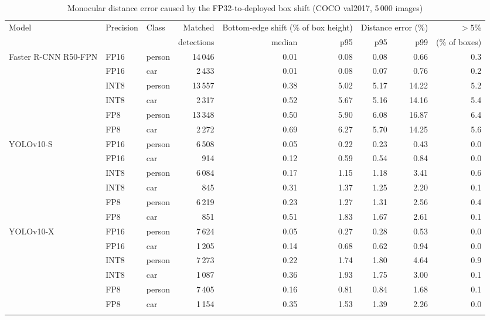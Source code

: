 \begin{table}
\footnotesize\setlength{\tabcolsep}{4pt}
\caption{Monocular distance error caused by the FP32-to-deployed box shift (COCO val2017, 5\,000 images)}\label{tab:localization}
\begin{tabular}{@{}lllrrrrrr@{}}
\toprule
Model & Precision & Class & Matched & \multicolumn{2}{c}{Bottom-edge shift (\% of box height)} & \multicolumn{2}{c}{Distance error (\%)} & $>5$\% \\
\cmidrule{5-6}\cmidrule{7-8}
 & & & detections & median & p95 & p95 & p99 & (\% of boxes) \\
\midrule
Faster R-CNN R50-FPN & FP16 & person & 14\,046 & 0.01 & 0.08 & 0.08 & 0.66 & 0.3 \\
 & FP16 & car & 2\,433 & 0.01 & 0.08 & 0.07 & 0.76 & 0.2 \\
 & INT8 & person & 13\,557 & 0.38 & 5.02 & 5.17 & 14.22 & 5.2 \\
 & INT8 & car & 2\,317 & 0.52 & 5.67 & 5.16 & 14.16 & 5.4 \\
 & FP8 & person & 13\,348 & 0.50 & 5.90 & 6.08 & 16.87 & 6.4 \\
 & FP8 & car & 2\,272 & 0.69 & 6.27 & 5.70 & 14.25 & 5.6 \\
\midrule
YOLOv10-S & FP16 & person & 6\,508 & 0.05 & 0.22 & 0.23 & 0.43 & 0.0 \\
 & FP16 & car & 914 & 0.12 & 0.59 & 0.54 & 0.84 & 0.0 \\
 & INT8 & person & 6\,084 & 0.17 & 1.15 & 1.18 & 3.41 & 0.6 \\
 & INT8 & car & 845 & 0.31 & 1.37 & 1.25 & 2.20 & 0.1 \\
 & FP8 & person & 6\,219 & 0.23 & 1.27 & 1.31 & 2.56 & 0.4 \\
 & FP8 & car & 851 & 0.51 & 1.83 & 1.67 & 2.61 & 0.1 \\
\midrule
YOLOv10-X & FP16 & person & 7\,624 & 0.05 & 0.27 & 0.28 & 0.53 & 0.0 \\
 & FP16 & car & 1\,205 & 0.14 & 0.68 & 0.62 & 0.94 & 0.0 \\
 & INT8 & person & 7\,273 & 0.22 & 1.74 & 1.80 & 4.64 & 0.9 \\
 & INT8 & car & 1\,087 & 0.36 & 1.93 & 1.75 & 3.00 & 0.1 \\
 & FP8 & person & 7\,405 & 0.16 & 0.81 & 0.84 & 1.68 & 0.1 \\
 & FP8 & car & 1\,154 & 0.35 & 1.53 & 1.39 & 2.26 & 0.0 \\
\botrule
\end{tabular}
\end{table}

